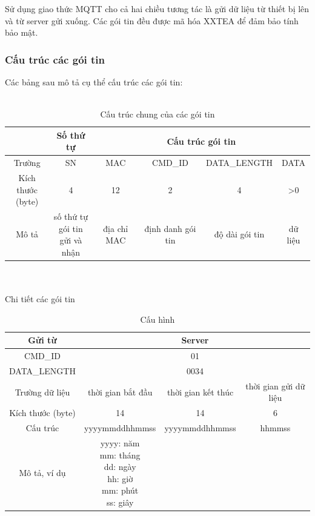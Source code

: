 \documentclass[a4paper,12pt,oneside]{article}
\begin{document}
\noindent Sử dụng giao thức MQTT cho cả hai chiều tương tác là gửi dữ liệu từ thiết bị lên và từ server gửi xuống. Các gói tin đều được mã hóa XXTEA để đảm bảo tính bảo mật.
\subsubsection{Cấu trúc các gói tin}
\noindent Các bảng sau mô tả cụ thể cấu trúc các gói tin:\\
\\
\begin{table}[!htp]
\begin{tabular}{|c|c|c|c|c|c|}
\hline 
 & Số thứ tự & \multicolumn{4}{|c|}{Cấu trúc gói tin} \\ 
\hline 
Trường & SN & MAC & CMD\_ID & DATA\_LENGTH  & DATA \\ 
\hline 
\makecell{Kích thước\\ (byte)} & 4 & 12 & 2 & 4 & >0 \\ 
\hline 
Mô tả & \makecell{số thứ tự \\ gói tin\\ gửi và nhận} & địa chỉ MAC & định danh gói tin & độ dài gói tin & dữ liệu \\ 
\hline 
\end{tabular} 
\caption{Cấu trúc chung của các gói tin}
\end{table}
\\
\\
\noindent Chi tiết các gói tin


\begin{table}[!htp]
\centering
\begin{tabular}{|c|c|c|c|}
\hline 
Gửi từ & \multicolumn{3}{c|}{Server} \\ 
\hline 
CMD\_ID & \multicolumn{3}{c|}{01} \\ 
\hline 
DATA\_LENGTH & \multicolumn{3}{c|}{0034} \\ 
\hline 
Trường dữ liệu & thời gian bắt đầu & thời gian kết thúc & thời gian gửi dữ liệu \\ 
\hline 
Kích thước (byte) & 14 & 14 & 6 \\ 
\hline 
Cấu trúc & yyyymmddhhmmss & yyyymmddhhmmss & hhmmss \\ 
\hline 
Mô tả, ví dụ & \makecell{yyyy: năm \\
mm: tháng \\ dd: ngày \\ hh: giờ \\ mm: phút \\ ss: giây} &  &  \\ 
\hline 
\end{tabular} 
\caption{Cấu hình}
\end{table}
\end{document}
